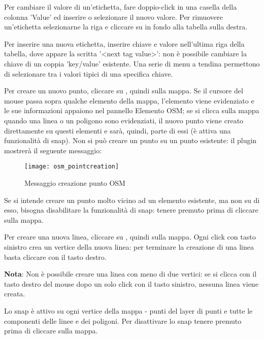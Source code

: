 Per cambiare il valore di un'etichetta, fare doppio-click in una casella della colonna 'Value' 
ed inserire o selezionare il nuovo valore. Per rimuovere un'etichetta selezionarne la riga 
e cliccare su  in fondo alla tabella sulla destra.

Per inserire una nuova etichetta, inserire chiave e valore nell'ultima riga della tabella, 
dove appare la scritta '<next tag value>': non è possibile cambiare la chiave di un coppia 
'key/value' esistente. 
Una serie di menu a tendina permettono di selezionare tra i valori tipici di una specifica chiave.


Per creare un nuovo punto, cliccare su , quindi sulla mappa.
Se il cursore del mouse passa sopra qualche elemento della mappa, l'elemento viene evidenziato
e le sue informazioni appaiono nel pannello Elemento OSM; se si clicca sulla mappa quando una linea o 
un poligono sono evidenziati, il nuovo punto viene creato direttamente su questi elementi e 
sarà, quindi, parte di essi (è attiva una funzionalità di snap). 
Non si può creare un punto su un punto esistente: il plugin 
mostrerà il seguente messaggio: 

\begin{figure}[ht]
   \centering
   \texttt{[image: osm\_pointcreation]}
   \caption{Messaggio creazione punto OSM \nixcaption}\label{fig:osmpoicreat}
\end{figure}

Se si intende creare un punto molto vicino ad un elemento esistente, ma non su di esso, 
bisogna disabilitare la funzionalità di snap: tenere premuto  prima di cliccare sulla 
mappa.


Per creare una nuova linea, cliccare su , quindi sulla mappa.
Ogni click con tasto sinistro crea un vertice della nuova linea: per terminare la 
creazione di una linea basta cliccare con il tasto destro.

\textbf{Nota}: Non è possibile creare una linea con meno di due vertici: se si clicca con il tasto 
destro del mouse dopo un solo click con il tasto sinistro, nessuna linea viene creata.

Lo snap è attivo su ogni vertice della mappa - punti del layer di punti e tutte le componenti delle linee 
e dei poligoni. Per disattivare lo snap tenere premuto  prima di cliccare sulla 
mappa.

